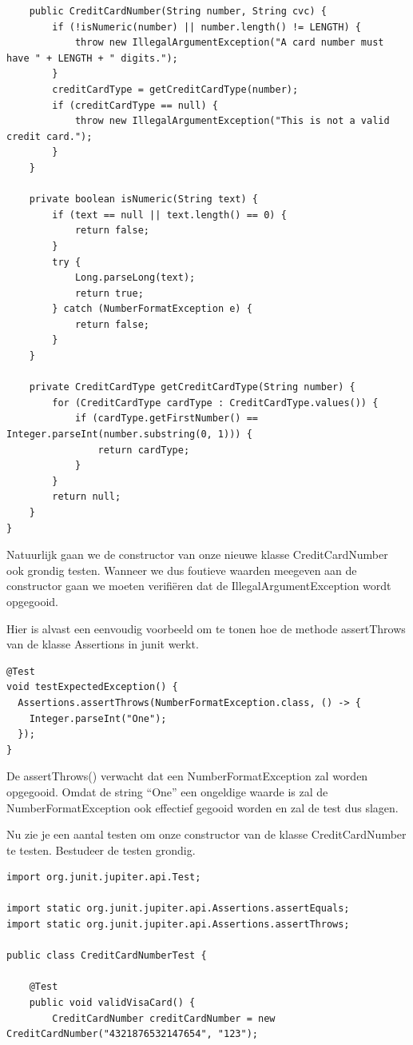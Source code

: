 \begin{itemize}
{\begin{lstlisting}
	public CreditCardNumber(String number, String cvc) {
		if (!isNumeric(number) || number.length() != LENGTH) {
			throw new IllegalArgumentException("A card number must have " + LENGTH + " digits.");
		}
		creditCardType = getCreditCardType(number);
		if (creditCardType == null) {
			throw new IllegalArgumentException("This is not a valid credit card.");
		}
	}

	private boolean isNumeric(String text) {
		if (text == null || text.length() == 0) {
			return false;
		}
		try {
			Long.parseLong(text);
			return true;
		} catch (NumberFormatException e) {
			return false;
		}
	}

	private CreditCardType getCreditCardType(String number) {
		for (CreditCardType cardType : CreditCardType.values()) {
			if (cardType.getFirstNumber() == Integer.parseInt(number.substring(0, 1))) {
				return cardType;
			}
		}
		return null;
	}
}
\end{lstlisting} 

Natuurlijk gaan we de constructor van onze nieuwe klasse CreditCardNumber ook grondig testen.  Wanneer we dus foutieve waarden meegeven aan de constructor gaan we moeten verifi\"eren dat de IllegalArgumentException wordt opgegooid.

Hier is alvast een eenvoudig voorbeeld om te tonen hoe de methode assertThrows van de klasse Assertions in junit werkt.

\begin{lstlisting}
@Test
void testExpectedException() {
  Assertions.assertThrows(NumberFormatException.class, () -> {
    Integer.parseInt("One");
  });
}
\end{lstlisting}

De assertThrows() verwacht dat een NumberFormatException zal worden opgegooid. Omdat de string ``One'' een ongeldige waarde is zal de NumberFormatException ook effectief gegooid worden en zal de test dus slagen.

Nu zie je een aantal testen om onze constructor van de klasse CreditCardNumber te testen. Bestudeer de testen grondig.


\begin{lstlisting}
import org.junit.jupiter.api.Test;

import static org.junit.jupiter.api.Assertions.assertEquals;
import static org.junit.jupiter.api.Assertions.assertThrows;

public class CreditCardNumberTest {

	@Test
	public void validVisaCard() {
		CreditCardNumber creditCardNumber = new CreditCardNumber("4321876532147654", "123");


\end{lstlisting}}
\end{itemize}
